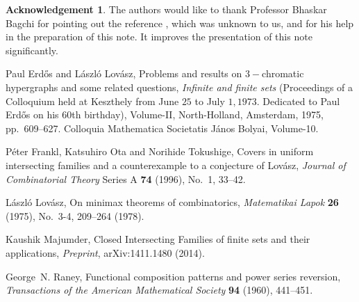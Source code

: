 \documentclass[a4paper,reqno,10pt]{amsart}
\theoremstyle{definition}
\newtheorem*{acknowledgement}{Acknowledgement}
\begin{document}
\begin{acknowledgement}
The authors would like to thank Professor Bhaskar Bagchi for pointing out the reference \cite{MR0114765}, which was unknown to us, and for his help in the preparation of this note. It improves the presentation of this note significantly. 
\end{acknowledgement}

\begin{thebibliography}{1}
{\sc Paul Erd\H{o}s} and {\sc L\'{a}szl\'{o} Lov\'{a}sz}, Problems and results on $3-$chromatic hypergraphs and some related questions, \emph{Infinite and finite sets} (Proceedings of a Colloquium held at Keszthely from June $25$ to July $1, 1973$. Dedicated to Paul Erd\H{o}s on his 60th birthday), Volume-II, North-Holland, Amsterdam, 1975, pp.~609--627. Colloquia Mathematica Societatis J\'{a}nos Bolyai, Volume-10.

{\sc P\'{e}ter Frankl}, {\sc Katsuhiro Ota} and {\sc Norihide Tokushige}, Covers in uniform intersecting families and a counterexample to a conjecture of Lov\'{a}sz, \emph{Journal of Combinatorial Theory} Series A \textbf{74} (1996), No.~1, 33--42. 

{\sc L\'{a}szl\'{o} Lov\'{a}sz}, On minimax theorems of combinatorics, \emph{Matematikai Lapok} \textbf{26} (1975), No.~3-4, 209--264 (1978).

{\sc Kaushik Majumder}, Closed Intersecting Families of finite sets and their applications, \emph{Preprint}, arXiv:1411.1480 (2014).

{\sc George~N. Raney}, Functional composition patterns and power series reversion, \emph{Transactions of the American Mathematical Society} \textbf{94} (1960), 441--451.
\end{thebibliography}
\end{document}
